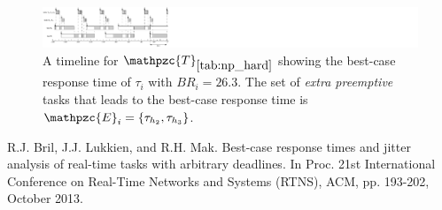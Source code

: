 \documentclass[fleqn]{article}
\begin{document}
\begin{figure}[H]
	\centering
	\includegraphics[width=1\linewidth]{figures/multiple_tasks2}
	\caption{A timeline for $\mathpzc{T}_{\ref{tab:np_hard}}$ showing the best-case response time of $\tau_i$ with $BR_i = 26.3$. The set of \textit{extra preemptive} tasks that leads to the best-case response time is $\mathpzc{E}_i=\{\tau_{h_2},\tau_{h_3}\}$.}
	\label{fig:np_hard2}
\end{figure}

\begin{thebibliography}{10}
	R.J. Bril, J.J. Lukkien, and R.H. Mak.
	Best-case response times and jitter analysis of real-time tasks with arbitrary deadlines.
	In Proc. 21st International Conference on Real-Time Networks and Systems (RTNS), ACM, pp. 193-202, October 2013.
	
\end{thebibliography}
\end{document}
